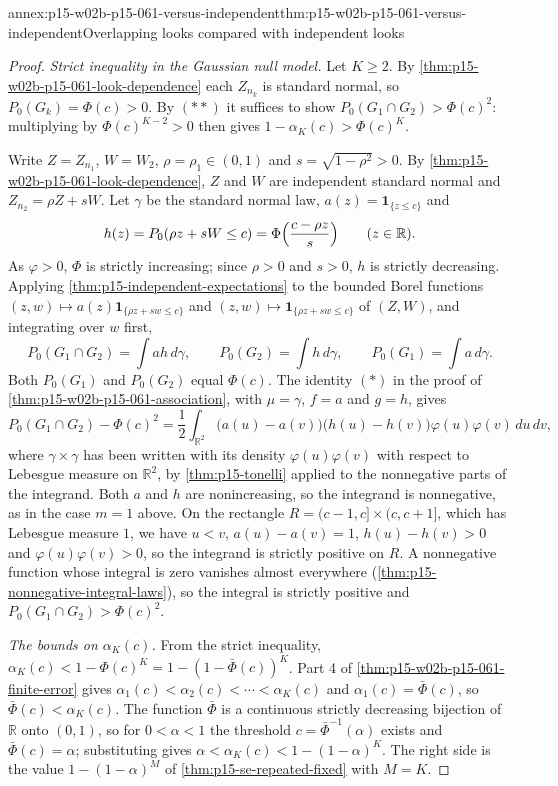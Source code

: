 \begin{annexitem}{annex:p15-w02b-p15-061-versus-independent}{thm:p15-w02b-p15-061-versus-independent}{Overlapping looks compared with independent looks}
\begin{proof}
\emph{Strict inequality in the Gaussian null model.} Let \(K\geq2\). By
\cref{thm:p15-w02b-p15-061-look-dependence} each \(Z_{n_k}\) is standard
normal, so \(P_0(G_k)=\Phi(c)>0\). By
\((\ast\ast)\) it suffices to show
\(P_0(G_1\cap G_2)>\Phi(c)^2\): multiplying by
\(\Phi(c)^{K-2}>0\) then gives \(1-\alpha_K(c)>\Phi(c)^K\).

Write \(Z=Z_{n_1}\), \(W=W_2\), \(\rho=\rho_1\in(0,1)\) and
\(s=\sqrt{1-\rho^2}>0\). By
\cref{thm:p15-w02b-p15-061-look-dependence}, \(Z\) and \(W\) are
independent standard normal and \(Z_{n_2}=\rho Z+sW\). Let \(\gamma\) be
the standard normal law, \(a(z)=\mathbf 1_{\{z\leq c\}}\) and
\[
 h(z)=P_0(\rho z+sW\leq c)=\Phi\Bigl(\frac{c-\rho z}{s}\Bigr)
 \qquad(z\in\mathbb R).
\]
As \(\varphi>0\), \(\Phi\) is strictly increasing; since \(\rho>0\) and
\(s>0\), \(h\) is strictly decreasing. Applying
\cref{thm:p15-independent-expectations} to the bounded Borel functions
\((z,w)\mapsto a(z)\mathbf 1_{\{\rho z+sw\leq c\}}\) and
\((z,w)\mapsto\mathbf 1_{\{\rho z+sw\leq c\}}\) of \((Z,W)\), and
integrating over \(w\) first,
\[
 P_0(G_1\cap G_2)=\int ah\,d\gamma,\qquad
 P_0(G_2)=\int h\,d\gamma,\qquad
 P_0(G_1)=\int a\,d\gamma .
\]
Both \(P_0(G_1)\) and \(P_0(G_2)\) equal \(\Phi(c)\). The identity
\((\ast)\) in the proof of
\cref{thm:p15-w02b-p15-061-association}, with \(\mu=\gamma\), \(f=a\)
and \(g=h\), gives
\[
 P_0(G_1\cap G_2)-\Phi(c)^2
 =\frac12\int_{\mathbb R^2}\bigl(a(u)-a(v)\bigr)\bigl(h(u)-h(v)\bigr)
 \varphi(u)\varphi(v)\,du\,dv ,
\]
where \(\gamma\times\gamma\) has been written with its density
\(\varphi(u)\varphi(v)\) with respect to Lebesgue measure on
\(\mathbb R^2\), by \cref{thm:p15-tonelli} applied to the nonnegative
parts of the integrand. Both \(a\) and \(h\) are nonincreasing, so the
integrand is nonnegative, as in the case \(m=1\) above. On the rectangle
\(R=(c-1,c]\times(c,c+1]\), which has Lebesgue measure \(1\), we have
\(u<v\), \(a(u)-a(v)=1\), \(h(u)-h(v)>0\) and
\(\varphi(u)\varphi(v)>0\), so the integrand is strictly positive on
\(R\). A nonnegative function whose integral is zero vanishes almost
everywhere (\cref{thm:p15-nonnegative-integral-laws}), so the integral is
strictly positive and \(P_0(G_1\cap G_2)>\Phi(c)^2\).

\emph{The bounds on \(\alpha_K(c)\).} From the strict inequality,
\(\alpha_K(c)<1-\Phi(c)^K=1-(1-\bar\Phi(c))^K\). Part 4 of
\cref{thm:p15-w02b-p15-061-finite-error} gives
\(\alpha_1(c)<\alpha_2(c)<\cdots<\alpha_K(c)\) and
\(\alpha_1(c)=\bar\Phi(c)\), so \(\bar\Phi(c)<\alpha_K(c)\). The function
\(\bar\Phi\) is a continuous strictly decreasing bijection of
\(\mathbb R\) onto \((0,1)\), so for \(0<\alpha<1\) the threshold
\(c=\bar\Phi^{-1}(\alpha)\) exists and \(\bar\Phi(c)=\alpha\); substituting
gives \(\alpha<\alpha_K(c)<1-(1-\alpha)^K\). The right side is the value
\(1-(1-\alpha)^M\) of \cref{thm:p15-se-repeated-fixed} with \(M=K\).
\end{proof}
\end{annexitem}

